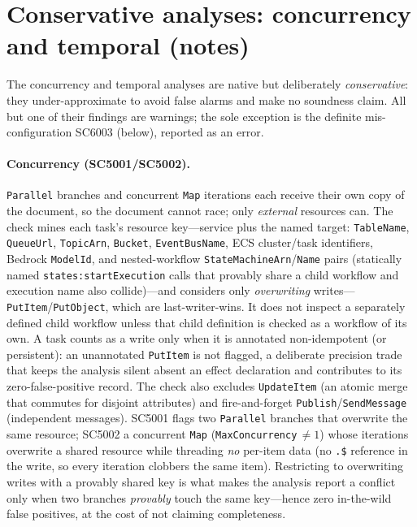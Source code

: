 \documentclass[11pt]{article}
\newcommand{\code}[1]{\textsf{\small #1}}
\theoremstyle{plain}
\theoremstyle{definition}
\theoremstyle{remark}
\begin{document}
\section{Conservative analyses: concurrency and temporal (notes)}
\label{sec:tr:cons}

The concurrency and temporal analyses are native but deliberately \emph{conservative}: they
under-approximate to avoid false alarms and make no soundness claim. All but one of their
findings are warnings; the sole exception is the definite mis-configuration \code{SC6003}
(below), reported as an error.

\paragraph{Concurrency (\code{SC5001}/\code{SC5002}).}
\texttt{Parallel} branches and concurrent \texttt{Map} iterations each receive their own copy
of the document, so the document cannot race; only \emph{external} resources can. The check
mines each task's resource key---service plus the named target: \texttt{TableName},
\texttt{QueueUrl}, \texttt{TopicArn}, \texttt{Bucket}, \texttt{EventBusName}, ECS cluster/task
identifiers, Bedrock \texttt{ModelId}, and nested-workflow \texttt{StateMachineArn}/\texttt{Name}
pairs (statically named \texttt{states:startExecution} calls that provably share a child workflow
and execution name also collide)---and considers only \emph{overwriting}
writes---\texttt{PutItem}/\texttt{PutObject}, which are last-writer-wins. It does not inspect a
separately defined child workflow unless that child definition is checked as a workflow of its
own. A task counts as a
write only when it is annotated non-idempotent (or persistent): an unannotated \texttt{PutItem}
is not flagged, a deliberate precision trade that keeps the analysis silent absent an
effect declaration and contributes to its zero-false-positive record. The check also
excludes \texttt{UpdateItem} (an atomic merge that commutes for disjoint attributes) and
fire-and-forget \texttt{Publish}/\texttt{SendMessage} (independent messages). \code{SC5001}
flags two \texttt{Parallel} branches that overwrite the same resource; \code{SC5002} a
concurrent \texttt{Map} (\texttt{MaxConcurrency}\,$\neq 1$) whose iterations overwrite a shared
resource while threading \emph{no} per-item data (no \texttt{.\$} reference in the write, so
every iteration clobbers the same item). Restricting to overwriting writes with a provably
shared key is what makes the analysis report a conflict only when two branches \emph{provably}
touch the same key---hence zero in-the-wild false positives, at the cost of not claiming
completeness.
\end{document}
